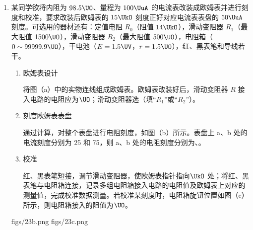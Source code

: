 \documentclass[\gkver]{gaokaozhenti}
\begin{document}
\begin{enumerate}
{\begin{enumerate}
	\item
	9.7

\end{enumerate}
}

\item
某同学欲将内阻为 $98.5\UO$、量程为 $100\UuA$ 的电流表改装成欧姆表并进行刻度和校准，要求改装后欧姆表的 $15\UkO$ 刻度正好对应电流表表盘的 $50\UuA$ 刻度。可选用的器材还有：定值电阻 $R_{0}$（阻值 $14\UkO$），滑动变阻器 $R_{1}$（最大阻值 $1500\UO$），滑动变阻器 $R_{2}$（最大阻值 $500\UO$），电阻箱（$0\sim99999.9\UO$），干电池（$E=1.5\UV$，$r=1.5\UO$），红、黑表笔和导线若干。
\begin{enumerate}
	\item
	欧姆表设计

	将图（a）中的实物连线组成欧姆表。欧姆表改装好后，滑动变阻器 $R$ 接入电路的电阻应为$\UO$；滑动变阻器选（填“$R_{1}$”或“$R_{2}$”）。
	\item
	刻度欧姆表表盘

	通过计算，对整个表盘进行电阻刻度，如图（b）所示。表盘上 a、b 处的电流刻度分别为 25 和 75，则 a、b 处的电阻刻度分别为、。
	\item
	校准

	红、黑表笔短接，调节滑动变阻器，使欧姆表指针指向$\UkO$ 处；将红、黑表笔与电阻箱连接，记录多组电阻箱接入电路的电阻值及欧姆表上对应的测量值，完成校准数据测量。若校准某刻度时，电阻箱旋钮位置如图（c）所示，则电阻箱接入的阻值为$\UO$。
\end{enumerate}
{figs/23b.png}
{figs/23c.png}


\end{enumerate}
\end{document}
